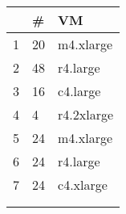 {\scriptsize
\begin{tabular}{@{}lll@{}}
\toprule
     & \#      & VM         \\ \midrule
1    & 20     & m4.xlarge  \\
2    & 48     & r4.large   \\
3    & 16     & c4.large   \\
4    & 4      & r4.2xlarge \\
5    & 24     & m4.xlarge   \\
6    & 24     & r4.large   \\
7    & 24     & c4.xlarge  \\
     &        &            \\
     &        &            \\ \bottomrule
\end{tabular}
}
